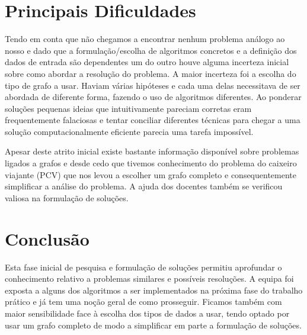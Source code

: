 \documentclass[12pt,a4paper,reqno]{report}
\numberwithin{figure}{section}
\numberwithin{equation}{section}
\begin{document}
\chapter{Principais Dificuldades}

Tendo em conta que não chegamos a encontrar nenhum problema análogo ao nosso e
dado que a formulação/escolha de algoritmos concretos e a definição dos dados de
entrada são dependentes um do outro houve alguma incerteza inicial sobre como
abordar a resolução do problema. A maior incerteza foi a escolha do tipo de
grafo a usar. Haviam várias hipóteses e cada uma delas necessitava de ser
abordada de diferente forma, fazendo o uso de algoritmos diferentes. Ao
ponderar soluções pequenas ideias que intuitivamente pareciam corretas eram
frequentemente falaciosas e tentar conciliar diferentes técnicas para chegar a
uma solução computacionalmente eficiente parecia uma tarefa impossível.

Apesar deste atrito inicial existe bastante informação disponível sobre
problemas ligados a grafos e desde cedo que tivemos conhecimento do problema do
caixeiro viajante (PCV) que nos levou a escolher um grafo completo e
consequentemente simplificar a análise do problema. A ajuda dos docentes também se verificou valiosa na formulação de soluções.


\chapter{Conclusão}

Esta fase inicial de pesquisa e formulação de soluções permitiu aprofundar o conhecimento relativo a problemas similares e possíveis resoluções. A equipa foi exposta a alguns dos algoritmos a ser implementados na próxima fase do trabalho prático e já tem uma noção geral de como prosseguir. 
Ficamos também com maior sensibilidade face à escolha dos tipos de dados a usar,
tendo optado por usar um grafo completo de modo a simplificar em parte a
formulação de soluções.
\end{document}
